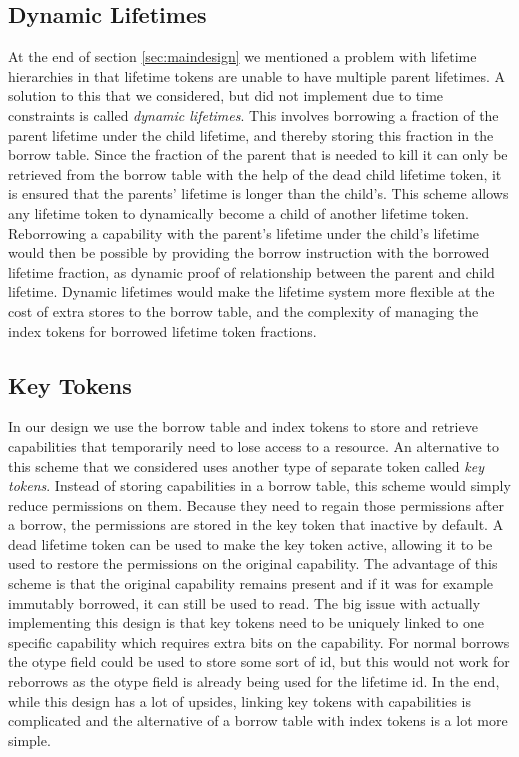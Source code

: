 \subsection{Dynamic Lifetimes}
\label{sec:dynamiclifetimes}
At the end of section \ref{sec:maindesign} we mentioned a problem with lifetime hierarchies in that lifetime tokens are unable to have multiple parent lifetimes.
A solution to this that we considered, but did not implement due to time constraints is called \textit{dynamic lifetimes}.
This involves borrowing a fraction of the parent lifetime under the child lifetime, and thereby storing this fraction in the borrow table.
Since the fraction of the parent that is needed to kill it can only be retrieved from the borrow table with the help of the dead child lifetime token, it is ensured that the parents' lifetime is longer than the child's.
This scheme allows any lifetime token to dynamically become a child of another lifetime token.
Reborrowing a capability with the parent's lifetime under the child's lifetime would then be possible by providing the borrow instruction with the borrowed lifetime fraction, as dynamic proof of relationship between the parent and child lifetime.
Dynamic lifetimes would make the lifetime system more flexible at the cost of extra stores to the borrow table, and the complexity of managing the index tokens for borrowed lifetime token fractions.

\subsection{Key Tokens}
In our design we use the borrow table and index tokens to store and retrieve capabilities that temporarily need to lose access to a resource.
An alternative to this scheme that we considered uses another type of separate token called \textit{key tokens}.
Instead of storing capabilities in a borrow table, this scheme would simply reduce permissions on them.
Because they need to regain those permissions after a borrow, the permissions are stored in the key token that inactive by default.
A dead lifetime token can be used to make the key token active, allowing it to be used to restore the permissions on the original capability.
The advantage of this scheme is that the original capability remains present and if it was for example immutably borrowed, it can still be used to read.
The big issue with actually implementing this design is that key tokens need to be uniquely linked to one specific capability which requires extra bits on the capability.
For normal borrows the otype field could be used to store some sort of id, but this would not work for reborrows as the otype field is already being used for the lifetime id.
In the end, while this design has a lot of upsides, linking key tokens with capabilities is complicated and the alternative of a borrow table with index tokens is a lot more simple.

